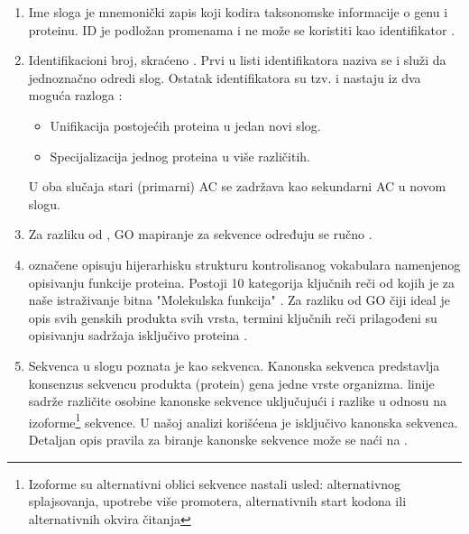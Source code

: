 \begin{enumerate}
  \item Ime sloga   je mnemonički zapis koji kodira
    taksonomske informacije o genu i proteinu. ID je podložan promenama 
    i ne može se koristiti kao identifikator \parencite{www_uniprot}.
  \item Identifikacioni broj, skraćeno  .
    Prvi u listi identifikatora naziva se  i služi da
    jednoznačno odredi slog. Ostatak identifikatora su tzv.  i
    nastaju iz dva moguća razloga \parencite{svisprot2003, www_uniprot}:
    \begin{itemize}
      \item Unifikacija postojećih proteina u jedan novi slog. 
      \item Specijalizacija jednog proteina u više različitih.
    \end{itemize}
    U oba slučaja stari (primarni) AC se zadržava kao sekundarni AC u novom slogu.

  \item Za razliku od \trembl, GO mapiranje za \swissprot sekvence određuju se ručno \parencite{www_uniprot}.

  \item {}  označene  opisuju
    hijerarhisku strukturu kontrolisanog vokabulara namenjenog opisivanju
    funkcije proteina. Postoji 10 kategorija ključnih reči od kojih je za naše
    istraživanje bitna "Molekulska funkcija"  \parencite{svisprot2003}.  Za
    razliku od GO čiji ideal je opis svih genskih produkta svih vrsta, termini
    ključnih reči prilagođeni su opisivanju sadržaja isključivo \swissprot
    proteina \parencite{www_uniprot}.

  \item Sekvenca  u slogu poznata je kao 
     sekvenca. Kanonska sekvenca predstavlja konsenzus sekvencu
    produkta (protein) gena jedne vrste organizma.   linije sadrže
    različite osobine kanonske sekvence uključujući i razlike u odnosu na
    izoforme\footnote{Izoforme su alternativni oblici sekvence nastali usled:
    alternativnog splajsovanja, upotrebe više promotera, alternativnih start
  kodona ili alternativnih okvira čitanja } sekvence.  U našoj analizi
  korišćena je isključivo kanonska sekvenca. Detaljan opis pravila za biranje
  kanonske sekvence može se naći na \cite{www_uniprot}.


\end{enumerate}
